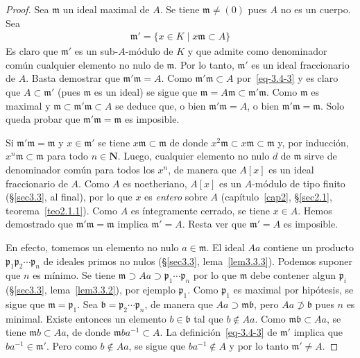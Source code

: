 \documentclass[10pt,oneside,bibtotoc,smallheadings,leqno,a5paper,DIV=12]{scrbook}
\newcommand{\NN}{\mathbf{N}}
\newcommand{\idl}[1]{\mathfrak{#1}}
\newcommand{\QED}{}%
\numberwithin{equation}{section}
\theoremstyle{defi}
\theoremstyle{enonce}
\theoremstyle{rem}
\numberwithin{theorem}{section}
\numberwithin{proposition}{section}
\numberwithin{definition}{section}
\numberwithin{lemma}{section}
\numberwithin{corollary}{section}
\numberwithin{example}{section}
\numberwithin{footnote}{section}%
\begin{document}
\begin{proof}
Sea $\idl{m}$ un ideal maximal de $A$. Se tiene $\idl{m}\neq(0)$ pues $A$ no es un cuerpo. Sea
\begin{gather}\label{eq-3.4-3}
\idl{m}' = \{x\in K\mid x\idl{m}\subset A\}
\end{gather}
Es claro que $\idl{m}'$ es un sub-$A$-m\'odulo de $K$ y que admite como denominador com\'un cualquier
elemento no nulo de $\idl{m}$. Por lo tanto, $\idl{m}'$ es un ideal fraccionario de $A$. Basta
demostrar que $\idl{m'}\idl{m} = A$.  Como $\idl{m}'\idl{m}\subset A$ por~\eqref{eq-3.4-3} y es claro que
$A\subset\idl{m}'$ (pues $\idl{m}$ es un ideal) se sigue que $\idl{m}=A\idl{m}\subset\idl{m'}\idl{m}$.
Como $\idl{m}$ es maximal y $\idl{m}\subset\idl{m'}\idl{m}\subset A$ se deduce que, o bien $\idl{m'}\idl{m} = A$,
o bien $\idl{m}'\idl{m} = \idl{m}$. Solo queda probar que $\idl{m}'\idl{m}=\idl{m}$ es imposible.

Si $\idl{m}'\idl{m} = \idl{m}$ y $x\in\idl{m}'$ se tiene $x\idl{m}\subset\idl{m}$ de donde $x^{2}\idl{m}\subset
x\idl{m}\subset\idl{m}$ y, por inducci\'on, $x^{n}\idl{m}\subset\idl{m}$ para todo $n\in\NN$. Luego, cualquier
elemento no nulo $d$ de $\idl{m}$ sirve de denominador com\'un para todos los $x^{n}$, de manera que
$A[x]$ es un ideal fraccionario de $A$. Como $A$ es noetheriano, $A[x]$ es un $A$-m\'odulo de tipo finito
(\S\ref{sec3.3}, al final), por lo que $x$ es {\em entero} sobre $A$ (cap\'itulo~\ref{cap2}, \S\ref{sec2.1}, teorema~\ref{teo2.1.1}).
Como $A$ es \'integramente
cerrado, se tiene $x\in A$. Hemos demostrado que $\idl{m}'\idl{m}=\idl{m}$ implica $\idl{m}'=A$. Resta ver que
$\idl{m}'=A$ es imposible.

En efecto, tomemos un elemento no nulo $a\in\idl{m}$. El ideal $Aa$ contiene un producto
$\idl{p}_{1}\idl{p}_{2}\cdots\idl{p}_{n}$ de ideales primos no nulos (\S\ref{sec3.3}, lema~\ref{lem3.3.3}). Podemos suponer que $n$
es m\'inimo. Se tiene $\idl{m}\supset Aa\supset\idl{p}_{1}\cdots\idl{p}_{n}$ por lo que $\idl{m}$ debe
contener algun $\idl{p}_{i}$ (\S\ref{sec3.3}, lema~\ref{lem3.3.2}), por ejemplo $\idl{p}_{1}$. Como $\idl{p}_{1}$ es maximal por
hip\'otesis, se sigue que $\idl{m} = \idl{p}_{1}$. Sea $\idl{b} = \idl{p}_{2}\cdots\idl{p}_{n}$, de manera
que $Aa\supset\idl{m}\idl{b}$, pero $Aa\not\supset\idl{b}$ pues $n$ es minimal. Existe entonces un elemento
$b\in\idl{b}$ tal que $b\notin Aa$. Como $\idl{m}\idl{b}\subset Aa$, se tiene $\idl{m}b\subset Aa$, de donde
$\idl{m}ba^{-1}\subset A$. La definici\'on~\eqref{eq-3.4-3} de $\idl{m}'$ implica que $ba^{-1}\in\idl{m}'$. Pero como
$b\notin Aa$, se sigue que $ba^{-1}\notin A$ y por lo tanto $\idl{m}'\neq A$. \QED
\end{proof}
\end{document}
